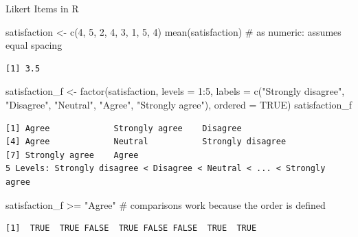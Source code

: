 \documentclass[
  ignorenonframetext,
  aspectratio=169,
]{beamer}
\newenvironment{Shaded}{\begin{snugshade}}{\end{snugshade}}
\newcommand{\AttributeTok}[1]{\textcolor[rgb]{0.40,0.45,0.13}{#1}}
\newcommand{\CommentTok}[1]{\textcolor[rgb]{0.37,0.37,0.37}{#1}}
\newcommand{\ConstantTok}[1]{\textcolor[rgb]{0.56,0.35,0.01}{#1}}
\newcommand{\DecValTok}[1]{\textcolor[rgb]{0.68,0.00,0.00}{#1}}
\newcommand{\FunctionTok}[1]{\textcolor[rgb]{0.28,0.35,0.67}{#1}}
\newcommand{\NormalTok}[1]{\textcolor[rgb]{0.00,0.23,0.31}{#1}}
\newcommand{\OtherTok}[1]{\textcolor[rgb]{0.00,0.23,0.31}{#1}}
\newcommand{\SpecialCharTok}[1]{\textcolor[rgb]{0.37,0.37,0.37}{#1}}
\newcommand{\StringTok}[1]{\textcolor[rgb]{0.13,0.47,0.30}{#1}}
\begin{document}
\begin{frame}[fragile]{Likert Items in R}
\protect\hypertarget{likert-items-in-r}{}
\begin{Shaded}
\begin{Highlighting}[]
\NormalTok{satisfaction }\OtherTok{\textless{}{-}} \FunctionTok{c}\NormalTok{(}\DecValTok{4}\NormalTok{, }\DecValTok{5}\NormalTok{, }\DecValTok{2}\NormalTok{, }\DecValTok{4}\NormalTok{, }\DecValTok{3}\NormalTok{, }\DecValTok{1}\NormalTok{, }\DecValTok{5}\NormalTok{, }\DecValTok{4}\NormalTok{)}
\FunctionTok{mean}\NormalTok{(satisfaction)          }\CommentTok{\# as numeric: assumes equal spacing}
\end{Highlighting}
\end{Shaded}

\begingroup\tiny\color{darkgray}

\begin{verbatim}
[1] 3.5
\end{verbatim}

\endgroup

\begin{Shaded}
\begin{Highlighting}[]
\NormalTok{satisfaction\_f }\OtherTok{\textless{}{-}} \FunctionTok{factor}\NormalTok{(satisfaction, }\AttributeTok{levels =} \DecValTok{1}\SpecialCharTok{:}\DecValTok{5}\NormalTok{,}
                         \AttributeTok{labels =} \FunctionTok{c}\NormalTok{(}\StringTok{"Strongly disagree"}\NormalTok{, }\StringTok{"Disagree"}\NormalTok{, }\StringTok{"Neutral"}\NormalTok{,}
                                    \StringTok{"Agree"}\NormalTok{, }\StringTok{"Strongly agree"}\NormalTok{),}
                         \AttributeTok{ordered =} \ConstantTok{TRUE}\NormalTok{)}
\NormalTok{satisfaction\_f}
\end{Highlighting}
\end{Shaded}

\begingroup\tiny\color{darkgray}

\begin{verbatim}
[1] Agree             Strongly agree    Disagree         
[4] Agree             Neutral           Strongly disagree
[7] Strongly agree    Agree            
5 Levels: Strongly disagree < Disagree < Neutral < ... < Strongly agree
\end{verbatim}

\endgroup

\begin{Shaded}
\begin{Highlighting}[]
\NormalTok{satisfaction\_f }\SpecialCharTok{\textgreater{}=} \StringTok{"Agree"}   \CommentTok{\# comparisons work because the order is defined}
\end{Highlighting}
\end{Shaded}

\begingroup\tiny\color{darkgray}

\begin{verbatim}
[1]  TRUE  TRUE FALSE  TRUE FALSE FALSE  TRUE  TRUE
\end{verbatim}

\endgroup
\end{frame}
\end{document}
